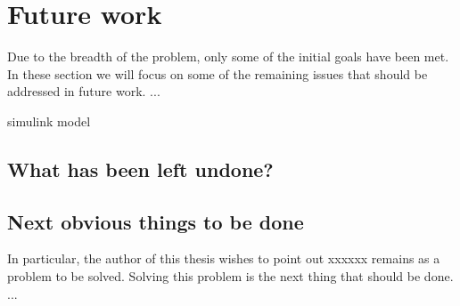 \documentclass[english]{kththesis}
\begin{document}
\section{Future work}
\label{sec:futureWork}
Due to the breadth of the problem, only some of the initial goals have been
met. In these section we will focus on some of the remaining issues that
should be addressed in future work. ...

simulink model
\subsection{What has been left undone?}
\label{what-has-been-left-undone}


%
%
%


\subsection{Next obvious things to be done}

In particular, the author of this thesis wishes to point out xxxxxx remains as
a problem to be solved. Solving this problem is the next thing that should be
done. ...
\end{document}
